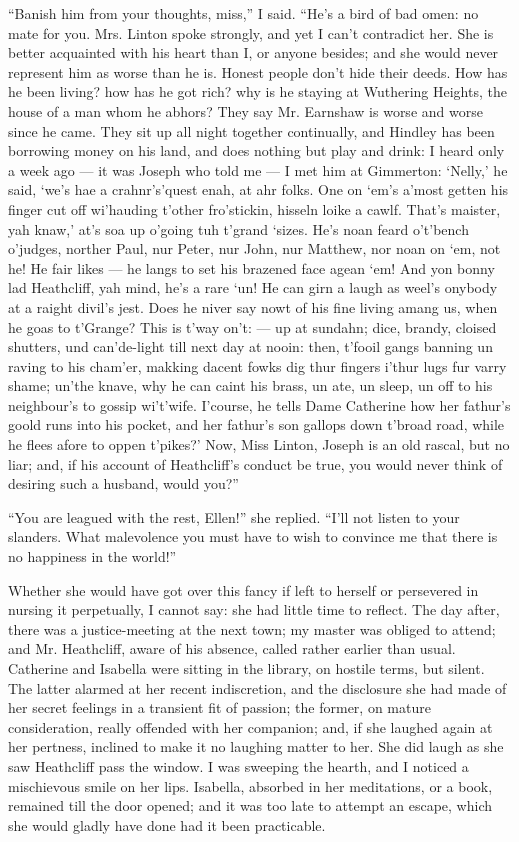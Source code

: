 \par “Banish him from your thoughts, miss,” I said. “He's a bird of bad omen: no mate for you. Mrs. Linton spoke strongly, and yet I can't contradict her. She is better acquainted with his heart than I, or anyone besides; and she would never represent him as worse than he is. Honest people don't hide their deeds. How has he been living? how has he got rich? why is he staying at Wuthering Heights, the house of a man whom he abhors? They say Mr. Earnshaw is worse and worse since he came. They sit up all night together continually, and Hindley has been borrowing money on his land, and does nothing but play and drink: I heard only a week ago — it was Joseph who told me — I met him at Gimmerton: ‘Nelly,’ he said, ‘we's hae a crahnr's'quest enah, at ahr folks. One on ‘em's a'most getten his finger cut off wi'hauding t'other fro'stickin, hisseln loike a cawlf. That's maister, yah knaw,’ at's soa up o'going tuh t'grand ‘sizes. He's noan feard o't'bench o'judges, norther Paul, nur Peter, nur John, nur Matthew, nor noan on ‘em, not he! He fair likes — he langs to set his brazened face agean ‘em! And yon bonny lad Heathcliff, yah mind, he's a rare ‘un! He can girn a laugh as weel's onybody at a raight divil's jest. Does he niver say nowt of his fine living amang us, when he goas to t'Grange? This is t'way on't: — up at sundahn; dice, brandy, cloised shutters, und can'de-light till next day at nooin: then, t'fooil gangs banning un raving to his cham'er, makking dacent fowks dig thur fingers i'thur lugs fur varry shame; un'the knave, why he can caint his brass, un ate, un sleep, un off to his neighbour's to gossip wi't'wife. I'course, he tells Dame Catherine how her fathur's goold runs into his pocket, and her fathur's son gallops down t'broad road, while he flees afore to oppen t'pikes?’ Now, Miss Linton, Joseph is an old rascal, but no liar; and, if his account of Heathcliff's conduct be true, you would never think of desiring such a husband, would you?”
\par “You are leagued with the rest, Ellen!” she replied. “I'll not listen to your slanders. What malevolence you must have to wish to convince me that there is no happiness in the world!”
\par Whether she would have got over this fancy if left to herself or persevered in nursing it perpetually, I cannot say: she had little time to reflect. The day after, there was a justice-meeting at the next town; my master was obliged to attend; and Mr. Heathcliff, aware of his absence, called rather earlier than usual. Catherine and Isabella were sitting in the library, on hostile terms, but silent. The latter alarmed at her recent indiscretion, and the disclosure she had made of her secret feelings in a transient fit of passion; the former, on mature consideration, really offended with her companion; and, if she laughed again at her pertness, inclined to make it no laughing matter to her. She did laugh as she saw Heathcliff pass the window. I was sweeping the hearth, and I noticed a mischievous smile on her lips. Isabella, absorbed in her meditations, or a book, remained till the door opened; and it was too late to attempt an escape, which she would gladly have done had it been practicable.
